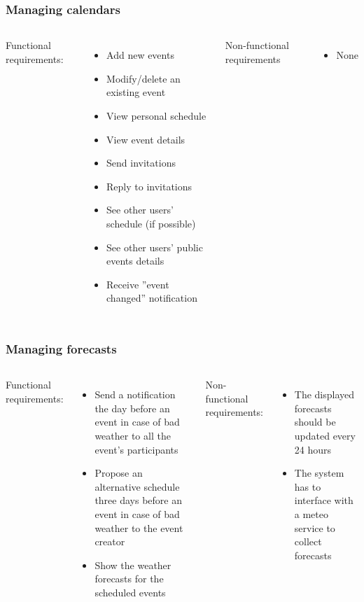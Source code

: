 \documentclass[professionalfonts]{beamer}
\begin{document}
\begin{frame}
\frametitle{Managing calendars}
\begin{columns}[c]
Functional requirements:
\begin{itemize}
\item Add new events
\item Modify/delete an existing event
\item View personal schedule
\item View event details
\item Send invitations
\item Reply to invitations
\item See other users' schedule (if possible)
\item See other users' public events details
\item Receive ''event changed'' notification
\end{itemize}
Non-functional requirements
\begin{itemize}
\item None
\end{itemize}
\end{columns}
\end{frame}

\begin{frame}
\frametitle{Managing forecasts}
\begin{columns}[c]
Functional requirements:
\begin{itemize}
\item Send a notification the day before an event in case of bad weather to all the event's participants
\item Propose an alternative schedule three days before an event in case of bad weather to the event creator
\item Show the weather forecasts for the scheduled events
\end{itemize}
Non-functional requirements:
\begin{itemize}
\item The displayed forecasts should be updated every 24 hours
\item The system has to interface with a meteo service to collect forecasts
\end{itemize}
\end{columns}
\end{frame}
\end{document}
